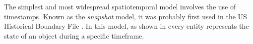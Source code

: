 The simplest and most widespread spatiotemporal model involves the use of timestamps.
Known as the \emph{snapshot} model, it was probably first used in the US Historical Boundary File \citep{Basoglu78}.
In this model, as shown in  every entity represents the state of an object during a specific timeframe.
